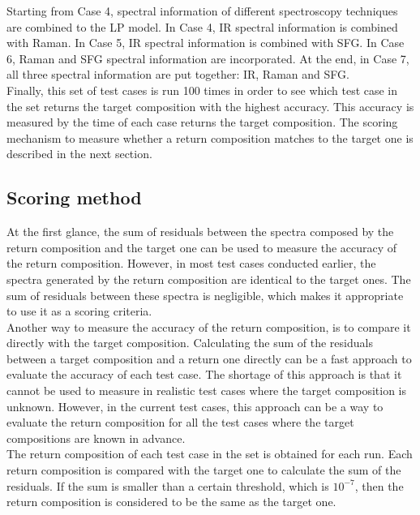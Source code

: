 Starting from Case 4, spectral information of different spectroscopy techniques are combined to the LP model. In Case 4, IR spectral information is combined with Raman. In Case 5, IR spectral information is combined with SFG. In Case 6, Raman and SFG spectral information are incorporated. At the end, in Case 7, all three spectral information are put together: IR, Raman and SFG. \\

Finally, this set of test cases is run 100 times in order to see which test case in the set returns the target composition with the highest accuracy. This accuracy is measured by the time of each case returns the target composition. The scoring mechanism to measure whether a return composition matches to the target one is described in the next section. \\

\subsection{Scoring method}

At the first glance, the sum of residuals between the spectra composed by the return composition and the target one can be used to measure the accuracy of the return composition. However, in most test cases conducted earlier, the spectra generated by the return composition are identical to the target ones. The sum of residuals between these spectra is negligible, which makes it appropriate to use it as a scoring criteria. \\

Another way to measure the accuracy of the return composition, is to compare it directly with the target composition. Calculating the sum of the residuals between a target composition and a return one directly can be a fast approach to evaluate the accuracy of each test case. The shortage of this approach is that it cannot be used to measure in realistic test cases where the target composition is unknown. However, in the current test cases, this approach can be a way to evaluate the return composition for all the test cases where the target compositions are known in advance. \\

The return composition of each test case in the set is obtained for each run. Each return composition is compared with the target one to calculate the sum of the residuals. If the sum is smaller than a certain threshold, which is $10^{-7}$, then the return composition is considered to be the same as the target one. \\

